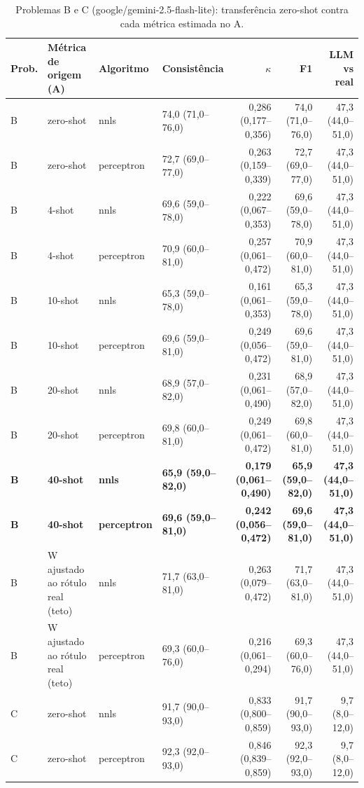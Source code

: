 \begin{table}[htbp]
\centering
\small
\caption{Problemas B e C (google/gemini-2.5-flash-lite): transferência zero-shot contra cada métrica estimada no A.}
\label{tab:T2_BC_flashlite}
\begin{tabular}{llllrrr}
\toprule
Prob. & Métrica de origem (A) & Algoritmo & Consistência & $\kappa$ & F1 & LLM vs real \\
\midrule
B & zero-shot & nnls & 74,0 (71,0–76,0) & 0,286 (0,177–0,356) & 74,0 (71,0–76,0) & 47,3 (44,0–51,0) \\
B & zero-shot & perceptron & 72,7 (69,0–77,0) & 0,263 (0,159–0,339) & 72,7 (69,0–77,0) & 47,3 (44,0–51,0) \\
B & 4-shot & nnls & 69,6 (59,0–78,0) & 0,222 (0,067–0,353) & 69,6 (59,0–78,0) & 47,3 (44,0–51,0) \\
B & 4-shot & perceptron & 70,9 (60,0–81,0) & 0,257 (0,061–0,472) & 70,9 (60,0–81,0) & 47,3 (44,0–51,0) \\
B & 10-shot & nnls & 65,3 (59,0–78,0) & 0,161 (0,061–0,353) & 65,3 (59,0–78,0) & 47,3 (44,0–51,0) \\
B & 10-shot & perceptron & 69,6 (59,0–81,0) & 0,249 (0,056–0,472) & 69,6 (59,0–81,0) & 47,3 (44,0–51,0) \\
B & 20-shot & nnls & 68,9 (57,0–82,0) & 0,231 (0,061–0,490) & 68,9 (57,0–82,0) & 47,3 (44,0–51,0) \\
B & 20-shot & perceptron & 69,8 (60,0–81,0) & 0,249 (0,061–0,472) & 69,8 (60,0–81,0) & 47,3 (44,0–51,0) \\
\textbf{B} & \textbf{40-shot} & \textbf{nnls} & \textbf{65,9 (59,0–82,0)} & \textbf{0,179 (0,061–0,490)} & \textbf{65,9 (59,0–82,0)} & \textbf{47,3 (44,0–51,0)} \\
\textbf{B} & \textbf{40-shot} & \textbf{perceptron} & \textbf{69,6 (59,0–81,0)} & \textbf{0,242 (0,056–0,472)} & \textbf{69,6 (59,0–81,0)} & \textbf{47,3 (44,0–51,0)} \\
B & W ajustado ao rótulo real (teto) & nnls & 71,7 (63,0–81,0) & 0,263 (0,079–0,472) & 71,7 (63,0–81,0) & 47,3 (44,0–51,0) \\
B & W ajustado ao rótulo real (teto) & perceptron & 69,3 (60,0–76,0) & 0,216 (0,061–0,294) & 69,3 (60,0–76,0) & 47,3 (44,0–51,0) \\
\midrule
C & zero-shot & nnls & 91,7 (90,0–93,0) & 0,833 (0,800–0,859) & 91,7 (90,0–93,0) & 9,7 (8,0–12,0) \\
C & zero-shot & perceptron & 92,3 (92,0–93,0) & 0,846 (0,839–0,859) & 92,3 (92,0–93,0) & 9,7 (8,0–12,0) \\

\end{tabular}
\end{table}
